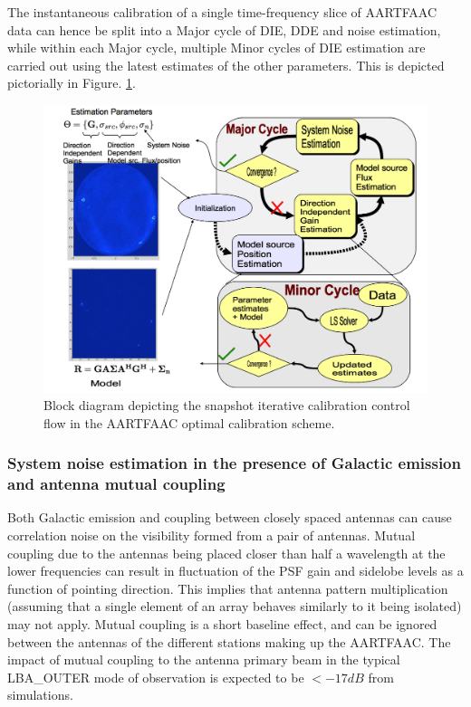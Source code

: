 \documentclass{aa}
\begin{document}
The instantaneous calibration of a single time-frequency slice of
AARTFAAC data can hence be split into a Major cycle of DIE, DDE and
noise estimation, while within each Major cycle, multiple Minor cycles
of DIE estimation are carried out using the latest estimates of the
other parameters. This is depicted pictorially in Figure. \ref{fig:Block-diagram-depicting}.

\begin{figure}[tbh]
\includegraphics[width=1\columnwidth]{Figs/convergent_cal_blkdia}\caption{\label{fig:Block-diagram-depicting}Block diagram depicting the snapshot
iterative calibration control flow in the AARTFAAC optimal calibration
scheme. }
\end{figure}



\subsubsection{\label{sub:System-noise-estimation}System noise estimation in the
presence of Galactic emission and antenna mutual coupling}

Both Galactic emission and coupling between closely spaced antennas
can cause correlation noise on the visibility formed from a pair of
antennas. Mutual coupling due to the antennas being placed closer
than half a wavelength at the lower frequencies can result in fluctuation
of the PSF gain and sidelobe levels as a function of pointing direction\cite{agrawal1972mutual}.
This implies that antenna pattern multiplication (assuming that a
single element of an array behaves similarly to it being isolated)
may not apply. Mutual coupling is a short baseline effect, and can
be ignored between the antennas of the different stations making up
the AARTFAAC. The impact of mutual coupling to the antenna primary
beam in the typical LBA\_OUTER mode of observation is expected to
be $<-17dB$ from simulations\cite{wijnholds2011situ}.
\end{document}
